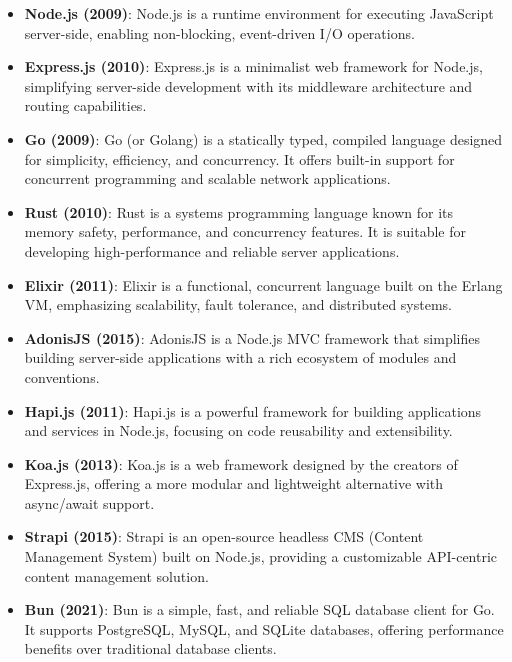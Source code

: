 \documentclass[conference]{IEEEtran}
\begin{document}
\begin{itemize}
    \item \textbf{Node.js (2009)}:
    Node.js is a runtime environment for executing JavaScript server-side, enabling non-blocking, event-driven I/O operations.
    
    \item \textbf{Express.js (2010)}:
    Express.js is a minimalist web framework for Node.js, simplifying server-side development with its middleware architecture and routing capabilities.
    
    \item \textbf{Go (2009)}:
    Go (or Golang) is a statically typed, compiled language designed for simplicity, efficiency, and concurrency. It offers built-in support for concurrent programming and scalable network applications.
    
    \item \textbf{Rust (2010)}:
    Rust is a systems programming language known for its memory safety, performance, and concurrency features. It is suitable for developing high-performance and reliable server applications.
    
    \item \textbf{Elixir (2011)}:
    Elixir is a functional, concurrent language built on the Erlang VM, emphasizing scalability, fault tolerance, and distributed systems.
    
    \item \textbf{AdonisJS (2015)}:
    AdonisJS is a Node.js MVC framework that simplifies building server-side applications with a rich ecosystem of modules and conventions.
    
    \item \textbf{Hapi.js (2011)}:
    Hapi.js is a powerful framework for building applications and services in Node.js, focusing on code reusability and extensibility.
    
    \item \textbf{Koa.js (2013)}:
    Koa.js is a web framework designed by the creators of Express.js, offering a more modular and lightweight alternative with async/await support.
    
    \item \textbf{Strapi (2015)}:
    Strapi is an open-source headless CMS (Content Management System) built on Node.js, providing a customizable API-centric content management solution.
    
    \item \textbf{Bun (2021)}:
    Bun is a simple, fast, and reliable SQL database client for Go. It supports PostgreSQL, MySQL, and SQLite databases, offering performance benefits over traditional database clients.
\end{itemize}
\end{document}
